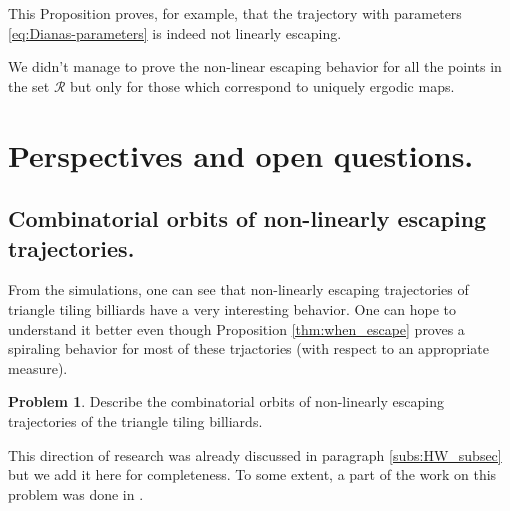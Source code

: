 \documentclass[12pt]{article}
\theoremstyle{definition}
\newtheorem*{problem}{Problem}
\begin{document}
This Proposition proves, for example, that the trajectory with parameters \ref{eq:Dianas-parameters} is indeed not linearly escaping.

We didn't manage to prove the non-linear escaping behavior for all the points in the set  $\boldsymbol{\mathcal{R}}$ but only for those which correspond to uniquely ergodic maps. 


\section{Perspectives and open questions.}\label{sec:perspectives}
\subsection{Combinatorial orbits of non-linearly escaping trajectories.}\label{subs:Hooper-Weiss}


From the simulations, one can see that non-linearly escaping trajectories of triangle tiling billiards have a very interesting behavior. One can hope to understand it better even though Proposition \ref{thm:when_escape} proves a spiraling behavior for most of these trjactories (with respect to an appropriate measure).

\begin{problem}
Describe the combinatorial orbits of non-linearly escaping trajectories of the triangle tiling billiards. 
\end{problem}
This direction of research was already discussed in paragraph \ref{subs:HW_subsec} but we add it here for completeness. To some extent, a part of the work on this problem was done in \cite{AHS16}. 


\end{document}
